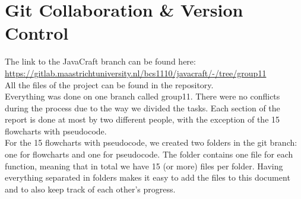 \section{Git Collaboration \& Version Control} \label{section: git}
The link to the JavaCraft branch can be found here: \href{https://gitlab.maastrichtuniversity.nl/bcs1110/javacraft/-/tree/group11}{https://gitlab.maastrichtuniversity.nl/bcs1110/javacraft/-/tree/group11} \\

All the files of the project can be found in the repository. \\ 
Everything was done on one branch called group11. There were no conflicts during the process due to the way we divided the tasks. Each section of the report is done at most by two different people, with the exception of the 15 flowcharts with pseudocode. \\
For the 15 flowcharts with pseudocode, we created two folders in the git branch: one for flowcharts and one for pseudocode. The folder contains one file for each function, meaning that in total we have 15 (or more) files per folder. Having everything separated in folders makes it easy to add the files to this document and to also keep track of each other's progress.